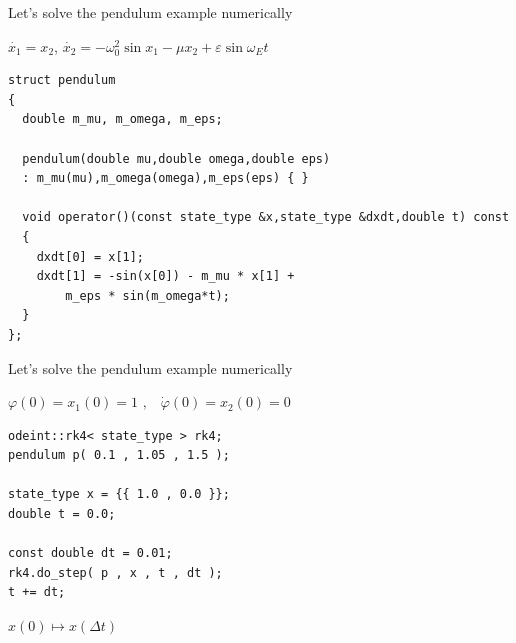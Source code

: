 \begin{frame}[fragile]

\centerline{ \Large Let's solve the pendulum example numerically}

\vspace{2ex}

$\dot{x_1} = x_2$, $\dot{x_2} = - \omega_0^2 \sin x_1 - \mu x_2 + \varepsilon \sin \omega_E t$

\vspace{2ex}

\begin{lstlisting}
struct pendulum
{
  double m_mu, m_omega, m_eps;

  pendulum(double mu,double omega,double eps)
  : m_mu(mu),m_omega(omega),m_eps(eps) { }

  void operator()(const state_type &x,state_type &dxdt,double t) const
  {
    dxdt[0] = x[1];
    dxdt[1] = -sin(x[0]) - m_mu * x[1] +
        m_eps * sin(m_omega*t);
  }
};
\end{lstlisting}

\end{frame}

\begin{frame}[fragile]
 \centerline{ \Large Let's solve the pendulum example numerically}

\vspace{2ex}
$\varphi(0) = x_1(0) = 1 \,\, \text{,} \quad \dot{\varphi}(0) = x_2(0) = 0$
\vspace{2ex}

\begin{lstlisting}
odeint::rk4< state_type > rk4;
pendulum p( 0.1 , 1.05 , 1.5 );

state_type x = {{ 1.0 , 0.0 }};
double t = 0.0;

const double dt = 0.01;
rk4.do_step( p , x , t , dt );
t += dt;
\end{lstlisting}

\vspace{2ex}

\centerline{$x(0) \mapsto x(\Delta t)$}

\end{frame}

